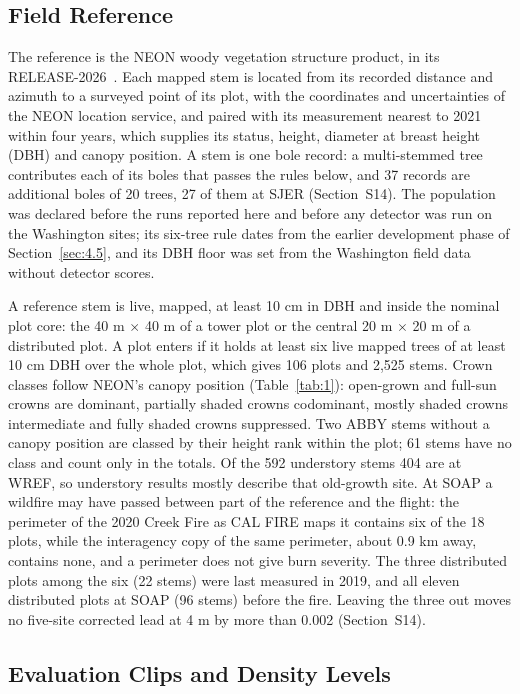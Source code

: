 \documentclass[journal]{IEEEtran}
\begin{document}
\subsection{Field Reference}\label{sec:3.2}

The reference is the NEON woody vegetation structure product, in its
RELEASE-2026~\cite{neon2026vegetation}. Each mapped stem is located from its
recorded distance and azimuth to a surveyed point of its plot, with the
coordinates and uncertainties of the NEON location service, and paired with its
measurement nearest to 2021 within four years, which supplies its status,
height, diameter at breast height (DBH) and canopy position. A stem is one bole
record: a multi-stemmed tree contributes each of its boles that passes the rules
below, and 37 records are additional boles of 20 trees, 27 of them at SJER
(Section~S14). The population was declared before the runs reported here and
before any detector was run on the Washington sites; its six-tree rule dates
from the earlier development phase of Section~\ref{sec:4.5}, and its DBH floor was set
from the Washington field data without detector scores.

A reference stem is live, mapped, at least 10 cm in DBH and inside the nominal
plot core: the 40 m $\times$ 40 m of a tower plot or the central 20 m $\times$ 20 m of a
distributed plot. A plot enters if it holds at least six live mapped trees of at
least 10 cm DBH over the whole plot, which gives 106 plots and 2,525 stems.
Crown classes follow NEON's canopy position (Table~\ref{tab:1}): open-grown and full-sun
crowns are dominant, partially shaded crowns codominant, mostly shaded crowns
intermediate and fully shaded crowns suppressed. Two ABBY stems without a canopy
position are classed by their height rank within the plot; 61 stems have no
class and count only in the totals. Of the 592 understory stems 404 are at WREF,
so understory results mostly describe that old-growth site. At SOAP a wildfire
may have passed between part of the reference and the flight: the perimeter of
the 2020 Creek Fire as CAL FIRE maps it contains six of the 18 plots, while the
interagency copy of the same perimeter, about 0.9 km away, contains none, and a
perimeter does not give burn severity. The three distributed plots among the six
(22 stems) were last measured in 2019, and all eleven distributed plots at SOAP
(96 stems) before the fire. Leaving the three out moves no five-site corrected
lead at 4 m by more than 0.002 (Section~S14).

\subsection{Evaluation Clips and Density Levels}\label{sec:3.3}
\end{document}
